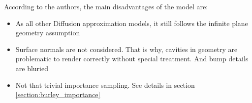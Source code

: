 According to the authors, the main disadvantages of the model are:
\begin{itemize}
  \item {As all other Diffusion approximation models, it still follows the
  infinite plane geometry assumption
  }
  \item {Surface normals are not considered. That is why, cavities in
  geometry are problematic to render correctly without special treatment. And
  bump details are bluried}
  \item{Not that trivial importance sampling. See details in section
  \ref{section:burley_importance}}
\end{itemize}